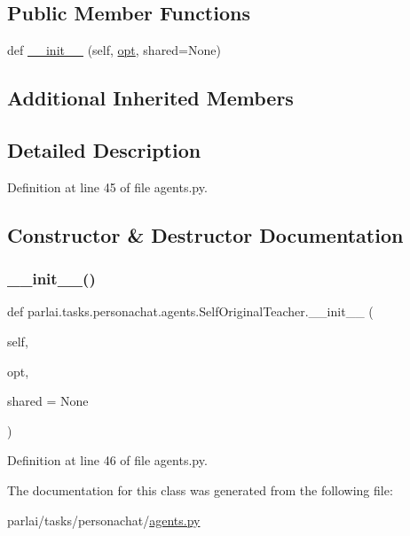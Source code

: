 \subsection*{Public Member Functions}
\begin{DoxyCompactItemize}
\item 
def \hyperlink{classparlai_1_1tasks_1_1personachat_1_1agents_1_1SelfOriginalTeacher_af64af069e88580a3365782e747637a01}{\+\_\+\+\_\+init\+\_\+\+\_\+} (self, \hyperlink{classparlai_1_1core_1_1teachers_1_1FbDialogTeacher_af7a9ec497b9cd0292d7b8fa220da7c28}{opt}, shared=None)
\end{DoxyCompactItemize}
\subsection*{Additional Inherited Members}


\subsection{Detailed Description}


Definition at line 45 of file agents.\+py.



\subsection{Constructor \& Destructor Documentation}
\mbox{\label{classparlai_1_1tasks_1_1personachat_1_1agents_1_1SelfOriginalTeacher_af64af069e88580a3365782e747637a01}} 
\subsubsection{\texorpdfstring{\+\_\+\+\_\+init\+\_\+\+\_\+()}{\_\_init\_\_()}}
{\footnotesize\ttfamily def parlai.\+tasks.\+personachat.\+agents.\+Self\+Original\+Teacher.\+\_\+\+\_\+init\+\_\+\+\_\+ (\begin{DoxyParamCaption}\item[{}]{self,  }\item[{}]{opt,  }\item[{}]{shared = {\ttfamily None} }\end{DoxyParamCaption})}



Definition at line 46 of file agents.\+py.



The documentation for this class was generated from the following file\+:\begin{DoxyCompactItemize}
\item 
parlai/tasks/personachat/\hyperlink{parlai_2tasks_2personachat_2agents_8py}{agents.\+py}\end{DoxyCompactItemize}
